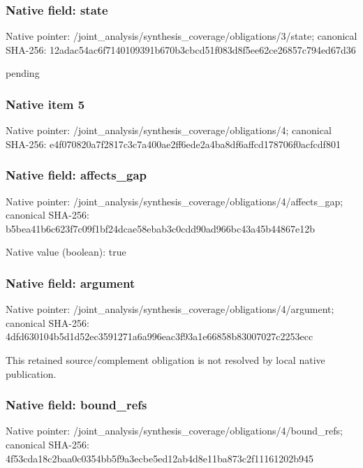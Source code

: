 \documentclass[10pt,a4paper]{article}
\begin{document}
\subsubsection{Native field: state}
Native pointer: /joint\_\allowbreak{}analysis/synthesis\_\allowbreak{}coverage/obligations/3/state; canonical SHA-256: 12adac54ac6f7140109391b670b3cbcd51f083d8f5ee62ce26857c794ed67d36

\begingroup\raggedright\sloppy pending\par\endgroup

\subsubsection{Native item 5}
Native pointer: /joint\_\allowbreak{}analysis/synthesis\_\allowbreak{}coverage/obligations/4; canonical SHA-256: e4f070820a7f2817c3c7a400ae2ff6ede2a4ba8df6affcd178706f0acfcdf801

\subsubsection{Native field: affects\_\allowbreak{}gap}
Native pointer: /joint\_\allowbreak{}analysis/synthesis\_\allowbreak{}coverage/obligations/4/affects\_\allowbreak{}gap; canonical SHA-256: b5bea41b6c623f7c09f1bf24dcae58ebab3c0cdd90ad966bc43a45b44867e12b

Native value (boolean): true

\subsubsection{Native field: argument}
Native pointer: /joint\_\allowbreak{}analysis/synthesis\_\allowbreak{}coverage/obligations/4/argument; canonical SHA-256: 4dfd630104b5d1d52ec3591271a6a996eac3f93a1e66858b83007027c2253ecc

\begingroup\raggedright\sloppy This retained source/\allowbreak{}complement obligation is not resolved by local native publication.\par\endgroup

\subsubsection{Native field: bound\_\allowbreak{}refs}
Native pointer: /joint\_\allowbreak{}analysis/synthesis\_\allowbreak{}coverage/obligations/4/bound\_\allowbreak{}refs; canonical SHA-256: 4f53cda18c2baa0c0354bb5f9a3ecbe5ed12ab4d8e11ba873c2f11161202b945
\end{document}

